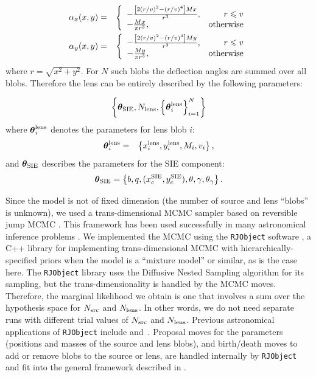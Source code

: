 \documentclass[useAMS,usenatbib]{mn2e}
\begin{document}

\begin{eqnarray}
\alpha_x(x, y) &=&
\left\{
\begin{array}{lr}
-\frac{\left[2(r/v)^2 - (r/v)^4\right]Mx}{r^3}, & r \leq v\\
-\frac{Mx}{\pi r^3}, & \textnormal{otherwise}
\end{array}
\right.\\
\alpha_y(x, y) &=&
\left\{
\begin{array}{lr}
-\frac{\left[2(r/v)^2 - (r/v)^4\right]My}{r^3}, & r \leq v\\
-\frac{My}{\pi r^3}, & \textnormal{otherwise}
\end{array}
\right.
\end{eqnarray}
where $r=\sqrt{x^2 + y^2}$. For $N$ such blobs the deflection angles are
summed over all blobs. Therefore the lens can be entirely described by
the following parameters:

\begin{eqnarray}
\left\{
\boldsymbol{\theta}_{\rm SIE},
N_{\rm lens}, \left\{\boldsymbol{\theta}^{\rm lens}_i\right\}_{i=1}^N
\right\}
\end{eqnarray}
where $\boldsymbol{\theta}^{\rm lens}_i$ denotes the parameters for lens blob $i$:
\begin{eqnarray}
\boldsymbol{\theta}^{\rm lens}_i &=& \left\{x_i^{\rm lens}, y_i^{\rm lens}, M_i, v_i
\right\},
\end{eqnarray}
and $\boldsymbol{\theta}_{\rm SIE}$ describes the parameters for the SIE
component:
\begin{eqnarray}
\boldsymbol{\theta}_{\rm SIE} = \left\{
b, q, (x_c^{\rm SIE}, y_c^{\rm SIE}), \theta, \gamma, \theta_\gamma
\right\}.
\end{eqnarray}

Since the model is not of fixed dimension (the number of source and lens
``blobs'' is unknown), we used a trans-dimensional MCMC sampler based on
reversible jump MCMC \citep{green}. This framework has been used successfully
in many astronomical inference problems \citep[e.g.][]{jones, renate}.
We implemented the MCMC using the
{\tt RJObject} software \citep{rjobject}, a C++ library for implementing trans-dimensional MCMC with hierarchically-specified priors when the model is
a ``mixture model'' or similar, as is the case here.
The {\tt RJObject} library uses the
Diffusive Nested Sampling algorithm \citep[DNS][]{dnest} for its sampling, but the
trans-dimensionality is handled by the MCMC moves. Therefore, the marginal
likelihood we obtain is one that involves a sum over the hypothesis space
for $N_{\rm src}$ and $N_{\rm lens}$. In other words, we do not need
separate runs with different trial values of $N_{\rm src}$ and $N_{\rm lens}$.
Previous astronomical
applications of {\tt RJObject} include \citet{magnetron}
and~\citet{exoplanet}. Proposal moves for the parameters (positions and masses
of the source and lens blobs), and birth/death moves to add or remove blobs
to the source or lens, are handled internally by {\tt RJObject} and
fit into the general framework described in \citet{rjobject}.
\end{document}
